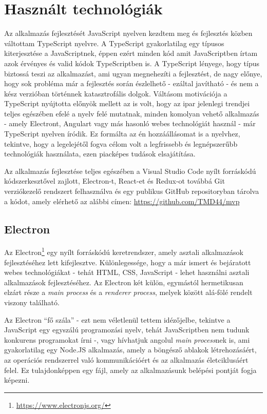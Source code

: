 \section{Használt technológiák}
Az alkalmazás fejlesztését JavaScript nyelven kezdtem meg és fejlesztés közben váltottam TypeScript nyelvre. A TypeScript gyakorlatilag egy típusos kiterjesztése a JavaScriptnek, éppen ezért minden kód amit JavaScriptben írtam azok érvényes és valid kódok TypeScriptben is. A TypeScript lényege, hogy típus biztossá teszi az alkalmazást, ami ugyan megnehezíti a fejlesztést, de nagy előnye, hogy sok probléma már a fejlesztés során észlelhető - ezáltal javítható - és nem a kész verzióban történnek katasztrofális dolgok. Váltásom motivációja a TypeScript nyújtotta előnyök mellett az is volt, hogy az ipar jelenlegi trendjei teljes egészében efelé a nyelv felé mutatnak, minden komolyan vehető alkalmazás - amely Electront, Angulart vagy más hasonló webes technológiát használ - már TypeScript nyelven íródik. Ez formálta az én hozzáállásomat is a nyelvhez, tekintve, hogy a legelejétől fogva célom volt a legfrissebb és legnépszerűbb technológiák használata, ezen piacképes tudások elsajátítása.

Az alkalmazás fejlesztése teljes egészében a Visual Studio Code nyílt forráskódú kódszerkesztővel zajlott, Electron-t, React-et és Redux-ot továbbá Git verziókezelő rendszert felhasználva és egy publikus GitHub repositoryban tárolva a kódot, amely elérhető az alábbi címen: \url{https://github.com/TMD44/mvp}

\subsection{Electron}
Az Electron\footnote{\url{https://www.electronjs.org/}} egy nyílt forráskódú keretrendszer, amely asztali alkalmazások fejlesztéséhez lett kifejlesztve. Különlegessége, hogy a már ismert és bejáratott webes technológiákat - tehát HTML, CSS, JavaScript - lehet használni asztali alkalmazások fejlesztéséhez. Az Electron két külön, egymástól hermetikusan elzárt része a {\it main process} és a {\it renderer process}, melyek között alá-fölé rendelt viszony található.

Az Electron ``fő szála'' - ezt nem véletlenül tettem idézőjelbe, tekintve a JavaScript egy egyszálú programozási nyelv, tehát JavaScriptben nem tudunk konkurens programokat írni -, vagy hívhatjuk angolul {\it main process}nek is, ami gyakorlatilag egy Node.JS alkalmazás, amely a böngésző ablakok létrehozásáért, az operációs rendszerrel való kommunikációért és az alkalmazás életciklusáért felel. Ez tulajdonképpen egy fájl, amely az alkalmazásunk belépési pontját fogja képezni.

